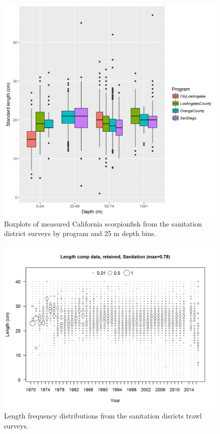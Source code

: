 \documentclass[12pt,]{article}
\begin{document}
\begin{figure}[htbp]
\centering
\includegraphics{Figures/Fleet7_Sanitation_lengthboxplots.png}
\caption{Boxplots of measured California scorpionfish from the
sanitation district surveys by program and 25 m depth bins.
\label{fig:Fleet7_Sanitation_lengthboxplots}}
\end{figure}

\begin{figure}[htbp]
\centering
\includegraphics{r4ss/plots_mod1/comp_lendat_bubflt7mkt2_page2.png}
\caption{Length frequency distributions from the sanitation disricts
trawl surveys. \label{fig:Fleet7_comp_lendat_bubflt10mkt2}}
\end{figure}
\end{document}
